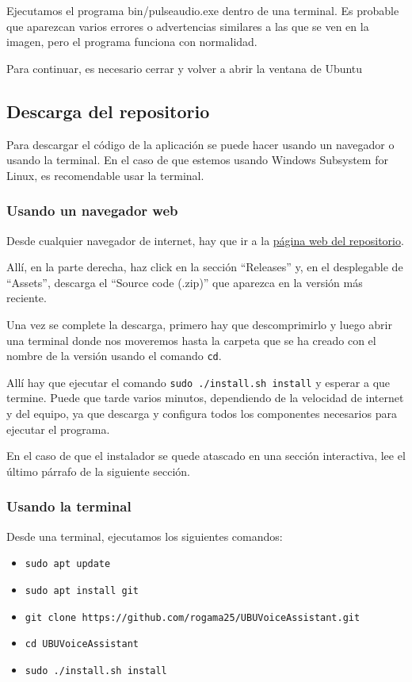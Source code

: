 Ejecutamos el programa bin/pulseaudio.exe dentro de una terminal. Es probable que aparezcan varios errores o advertencias similares a las que se ven en la imagen, pero el programa funciona con normalidad.


Para continuar, es necesario cerrar y volver a abrir la ventana de Ubuntu

\subsection{Descarga del repositorio}
Para descargar el código de la aplicación se puede hacer usando un navegador o usando la terminal. En el caso de que estemos usando Windows Subsystem for Linux, es recomendable usar la terminal.

\subsubsection{Usando un navegador web}
Desde cualquier navegador de internet, hay que ir a la \href{https://github.com/rogama25/UBUVoiceAssistant}{página web del repositorio}.

Allí, en la parte derecha, haz click en la sección ``Releases'' y, en el desplegable de ``Assets'', descarga el ``Source code (.zip)'' que aparezca en la versión más reciente.

Una vez se complete la descarga, primero hay que descomprimirlo y luego abrir una terminal donde nos moveremos hasta la carpeta que se ha creado con el nombre de la versión usando el comando \texttt{cd}.

Allí hay que ejecutar el comando \texttt{sudo ./install.sh install} y esperar a que termine. Puede que tarde varios minutos, dependiendo de la velocidad de internet y del equipo, ya que descarga y configura todos los componentes necesarios para ejecutar el programa.

En el caso de que el instalador se quede atascado en una sección interactiva, lee el último párrafo de la siguiente sección.

\subsubsection{Usando la terminal}
Desde una terminal, ejecutamos los siguientes comandos:
\begin{itemize}
    \item \texttt{sudo apt update}
    \item \texttt{sudo apt install git}
    \item \texttt{git clone https://github.com/rogama25/UBUVoiceAssistant.git}
    \item \texttt{cd UBUVoiceAssistant}
    \item \texttt{sudo ./install.sh install}
\end{itemize}

